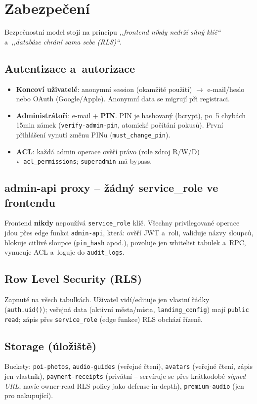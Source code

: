 \documentclass[11pt,a4paper]{article}
\newcommand{\code}[1]{\texttt{#1}}
\begin{document}
\section{Zabezpečení}
Bezpečnostní model stojí na principu \emph{,,frontend nikdy nedrží silný klíč``}
a~\emph{,,databáze chrání sama sebe (RLS)``}.

\subsection{Autentizace a~autorizace}
\begin{itemize}[nosep]
  \item \textbf{Koncoví uživatelé}: anonymní session (okamžité použití) $\rightarrow$
        e-mail/heslo nebo OAuth (Google/Apple). Anonymní data se migrují při registraci.
  \item \textbf{Administrátoři}: e-mail + \textbf{PIN}. PIN je hashovaný (bcrypt),
        po~5 chybách 15min zámek (\code{verify-admin-pin}, atomické počítání pokusů).
        První přihlášení vynutí změnu PINu (\code{must\_change\_pin}).
  \item \textbf{ACL}: každá admin operace ověří právo (role \texttimes{} zdroj \texttimes{}
        R/W/D) v~\code{acl\_permissions}; \code{superadmin} má bypass.
\end{itemize}

\subsection{admin-api proxy -- žádný service\_role ve frontendu}
Frontend \textbf{nikdy} nepoužívá \code{service\_role} klíč. Všechny privilegované
operace jdou přes edge funkci \code{admin-api}, která: ověří JWT a~roli, validuje
názvy sloupců, blokuje citlivé sloupce (\code{pin\_hash} apod.), povoluje jen
whitelist tabulek a~RPC, vynucuje ACL a~loguje do \code{audit\_logs}.

\subsection{Row Level Security (RLS)}
Zapnuté na všech tabulkách. Uživatel vidí/edituje jen vlastní řádky
(\code{auth.uid()}); veřejná data (aktivní města/místa, \code{landing\_config})
mají \code{public read}; zápis přes \code{service\_role} (edge funkce) RLS obchází
řízeně.

\subsection{Storage (úložiště)}
Buckety: \code{poi-photos}, \code{audio-guides} (veřejné čtení), \code{avatars}
(veřejné čtení, zápis jen vlastník), \code{payment-receipts} (privátní -- servíruje
se přes krátkodobé \emph{signed URL}; navíc owner-read RLS policy jako
defense-in-depth), \code{premium-audio} (jen pro nakupující).
\end{document}

